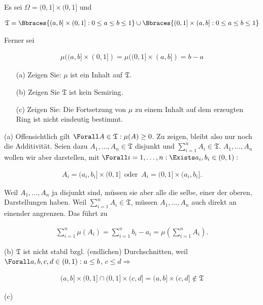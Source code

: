 \begin{exercise}

Es sei $\Omega = (0, 1] \times (0, 1]$ und

\begin{align*}
  \mathfrak{T}
  =
  \Bbraces{(a, b] \times (0, 1]: 0 \leq a \leq b \leq 1}
  \cup
  \Bbraces{(0, 1] \times (a, b]: 0 \leq a \leq b \leq 1}
\end{align*}

Ferner sei

\begin{align*}
  \mu((a, b] \times (0, 1]) = \mu((0, 1] \times (a, b]) = b - a
\end{align*}

\begin{itemize}
  \item[(a)] Zeigen Sie: $\mu$ ist ein Inhalt auf $\mathfrak{T}$.
  \item[(b)] Zeigen Sie $\mathfrak{T}$ ist kein Semiring.
  \item[(c)] Zeigen Sie: Die Fortsetzung von $\mu$ zu einem Inhalt auf dem erzeugten Ring ist nicht eindeutig bestimmt.
\end{itemize}

\end{exercise}


\begin{solution}

(a) Offensichtlich gilt $\Forall A \in \mathfrak{T}: \mu(A) \geq 0$. Zu zeigen, bleibt also nur noch die Additivität. Seien dazu $A_1, \ldots, A_n \in \mathfrak{T}$ disjunkt und $\sum_{i=1}^n A_i \in \mathfrak{T}$. $A_1, \ldots, A_n$ wollen wir aber darstellen, mit $\Forall i = 1, \ldots, n: \Exists a_i, b_i \in (0, 1):$

\begin{align*}
  A_i = (a_i, b_i] \times (0, 1]
  \enspace \text{oder} \enspace
  A_i = (0, 1] \times (a_i, b_i].
\end{align*}

Weil $A_1, \ldots, A_n$ ja disjunkt sind, müssen sie aber alle die selbe, einer der oberen, Darstellungen haben. Weil $\sum_{i=1}^n A_i \in \mathfrak{T}$, müssen $A_1, \ldots, A_n$ auch direkt an einender angrenzen. Das führt zu

\begin{align*}
  \sum_{i=1}^n \mu(A_i)
  =
  \sum_{i=1}^n b_i - a_i
  =
  \mu(\sum_{i=1}^n A_i).
\end{align*}

(b) $\mathfrak{T}$ ist nicht stabil bzgl. (endlichen) Durchschnitten, weil $\Forall a, b, c, d \in (0, 1): a \leq b$, $c \leq d \Rightarrow$

\begin{align*}
  (a, b] \times (0, 1]
  \cap
  (0, 1] \times (c, d]
  =
  (a, b] \times (c, d]
  \notin \mathfrak{T}
\end{align*}

(c)

\end{solution}
